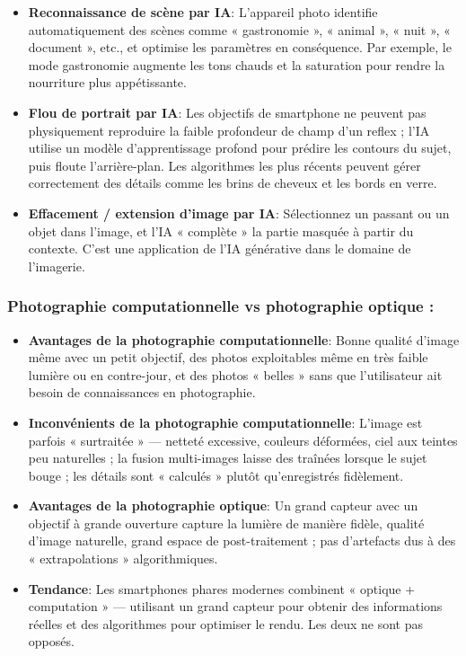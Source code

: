 \begin{itemize}
  \item \textbf{Reconnaissance de scène par IA}: L'appareil photo identifie automatiquement des scènes comme « gastronomie », « animal », « nuit », « document », etc., et optimise les paramètres en conséquence. Par exemple, le mode gastronomie augmente les tons chauds et la saturation pour rendre la nourriture plus appétissante.
  \item \textbf{Flou de portrait par IA}: Les objectifs de smartphone ne peuvent pas physiquement reproduire la faible profondeur de champ d'un reflex ; l'IA utilise un modèle d'apprentissage profond pour prédire les contours du sujet, puis floute l'arrière-plan. Les algorithmes les plus récents peuvent gérer correctement des détails comme les brins de cheveux et les bords en verre.
  \item \textbf{Effacement / extension d'image par IA}: Sélectionnez un passant ou un objet dans l'image, et l'IA « complète » la partie masquée à partir du contexte. C'est une application de l'IA générative dans le domaine de l'imagerie.
\end{itemize}

\subsubsection*{Photographie computationnelle vs photographie optique :}

\begin{itemize}
  \item \textbf{Avantages de la photographie computationnelle}: Bonne qualité d'image même avec un petit objectif, des photos exploitables même en très faible lumière ou en contre-jour, et des photos « belles » sans que l'utilisateur ait besoin de connaissances en photographie.
  \item \textbf{Inconvénients de la photographie computationnelle}: L'image est parfois « surtraitée » — netteté excessive, couleurs déformées, ciel aux teintes peu naturelles ; la fusion multi-images laisse des traînées lorsque le sujet bouge ; les détails sont « calculés » plutôt qu'enregistrés fidèlement.
  \item \textbf{Avantages de la photographie optique}: Un grand capteur avec un objectif à grande ouverture capture la lumière de manière fidèle, qualité d'image naturelle, grand espace de post-traitement ; pas d'artefacts dus à des « extrapolations » algorithmiques.
  \item \textbf{Tendance}: Les smartphones phares modernes combinent « optique + computation » — utilisant un grand capteur pour obtenir des informations réelles et des algorithmes pour optimiser le rendu. Les deux ne sont pas opposés.
\end{itemize}

